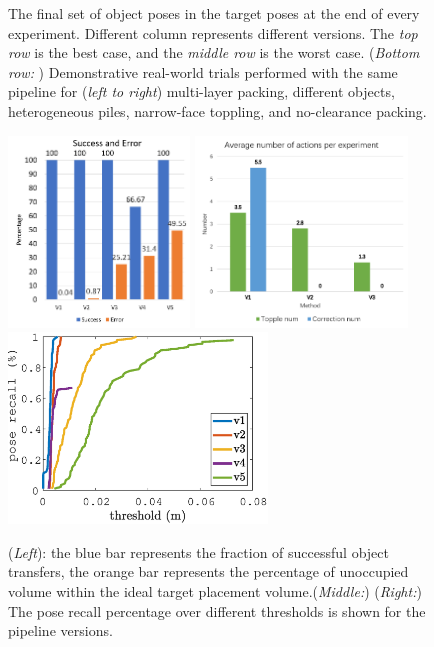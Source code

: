 \begin{figure}[ht]
\vspace{-0.1in}
\caption{The final set of object poses in the target poses at the end of every experiment. Different column represents different versions. The \textit{top row} is the best case, and the \textit{middle row} is the worst case. (\textit{Bottom row: }) Demonstrative real-world trials performed with the same pipeline for (\textit{left to right}) multi-layer packing, different objects, heterogeneous piles, narrow-face toppling, and no-clearance packing.
}
\label{fig:final_bin_configs}
\end{figure}

\begin{figure}[h]
\centering
\includegraphics[height=2in]{Figures/histogram.png}
\includegraphics[height=2in]{Figures/action_num.png}
\includegraphics[height=2in]{Figures/real.eps}
\vspace{-0.1in}
\caption{(\textit{Left}): the blue bar represents the fraction of successful object transfers, the orange bar represents the percentage of unoccupied volume within the ideal target placement volume.(\textit{Middle:})  (\textit{Right:}) The pose recall percentage over different thresholds is shown for the pipeline versions.
}
\label{fig:real_data}
\end{figure}

